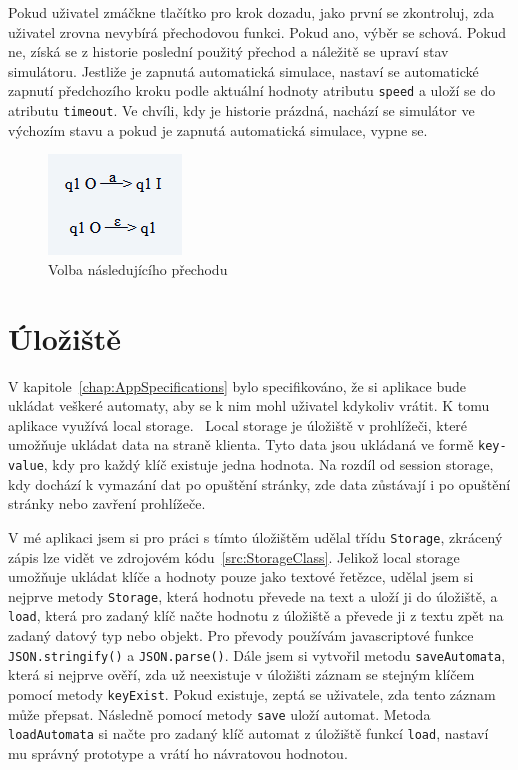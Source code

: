 Pokud uživatel zmáčkne tlačítko pro krok dozadu, jako první se zkontroluj, zda uživatel zrovna nevybírá přechodovou funkci. Pokud ano, výběr se schová. Pokud ne, získá se z historie poslední použitý přechod a náležitě se upraví stav simulátoru. Jestliže je zapnutá automatická simulace, nastaví se automatické zapnutí předchozího kroku podle aktuální hodnoty atributu \texttt{speed} a uloží se do atributu \texttt{timeout}. Ve chvíli, kdy je historie prázdná, nachází se simulátor ve výchozím stavu a pokud je zapnutá automatická simulace, vypne se.

\begin{figure}[h]
    \centering
    \includegraphics{Figures/PrntScrn_TransitionFunctionChoosing.png}
    \caption{Volba následujícího přechodu}\label{fig:TransitionFunctionChoosing}
\end{figure}

\section{Úložiště}

V kapitole~\ref{chap:AppSpecifications} bylo specifikováno, že si aplikace bude ukládat veškeré automaty, aby se k nim mohl uživatel kdykoliv vrátit. K tomu aplikace využívá local storage.~\cite{LocalStorage} Local storage je úložiště v prohlížeči, které umožňuje ukládat data na straně klienta. Tyto data jsou ukládaná ve formě \texttt{key-value}, kdy pro každý klíč existuje jedna hodnota. Na rozdíl od session storage, kdy dochází k vymazání dat po opuštění stránky, zde data zůstávají i po opuštění stránky nebo zavření prohlížeče.~\cite{Obaseki2020}

V mé aplikaci jsem si pro práci s tímto úložištěm udělal třídu \texttt{Storage}, zkrácený zápis lze vidět ve zdrojovém kódu~\ref{src:StorageClass}. Jelikož local storage umožňuje ukládat klíče a hodnoty pouze jako textové řetězce, udělal jsem si nejprve metody \texttt{Storage}, která hodnotu převede na text a uloží ji do úložiště, a \texttt{load}, která pro zadaný klíč načte hodnotu z úložiště a převede ji z textu zpět na zadaný datový typ nebo objekt. Pro převody používám javascriptové funkce \texttt{JSON.stringify()} a \texttt{JSON.parse()}. Dále jsem si vytvořil metodu \texttt{saveAutomata}, která si nejprve ověří, zda už neexistuje v úložišti záznam se stejným klíčem pomocí metody \texttt{keyExist}. Pokud existuje, zeptá se uživatele, zda tento záznam může přepsat. Následně pomocí metody \texttt{save} uloží automat. Metoda \texttt{loadAutomata} si načte pro zadaný klíč automat z úložiště funkcí \texttt{load}, nastaví mu správný prototype a vrátí ho návratovou hodnotou. 

